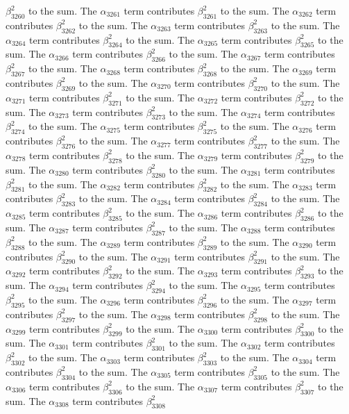 \begin{lemma}
$\beta_{3260}^{2}$ to the sum. The $\alpha_{3261}$ term contributes $\beta_{3261}^{2}$ to the sum. The $\alpha_{3262}$ term contributes $\beta_{3262}^{2}$ to the sum. The $\alpha_{3263}$ term contributes $\beta_{3263}^{2}$ to the sum. The $\alpha_{3264}$ term contributes $\beta_{3264}^{2}$ to the sum. The $\alpha_{3265}$ term contributes $\beta_{3265}^{2}$ to the sum. The $\alpha_{3266}$ term contributes $\beta_{3266}^{2}$ to the sum. The $\alpha_{3267}$ term contributes $\beta_{3267}^{2}$ to the sum. The $\alpha_{3268}$ term contributes $\beta_{3268}^{2}$ to the sum. The $\alpha_{3269}$ term contributes $\beta_{3269}^{2}$ to the sum. The $\alpha_{3270}$ term contributes $\beta_{3270}^{2}$ to the sum. The $\alpha_{3271}$ term contributes $\beta_{3271}^{2}$ to the sum. The $\alpha_{3272}$ term contributes $\beta_{3272}^{2}$ to the sum. The $\alpha_{3273}$ term contributes $\beta_{3273}^{2}$ to the sum. The $\alpha_{3274}$ term contributes $\beta_{3274}^{2}$ to the sum. The $\alpha_{3275}$ term contributes $\beta_{3275}^{2}$ to the sum. The $\alpha_{3276}$ term contributes $\beta_{3276}^{2}$ to the sum. The $\alpha_{3277}$ term contributes $\beta_{3277}^{2}$ to the sum. The $\alpha_{3278}$ term contributes $\beta_{3278}^{2}$ to the sum. The $\alpha_{3279}$ term contributes $\beta_{3279}^{2}$ to the sum. The $\alpha_{3280}$ term contributes $\beta_{3280}^{2}$ to the sum. The $\alpha_{3281}$ term contributes $\beta_{3281}^{2}$ to the sum. The $\alpha_{3282}$ term contributes $\beta_{3282}^{2}$ to the sum. The $\alpha_{3283}$ term contributes $\beta_{3283}^{2}$ to the sum. The $\alpha_{3284}$ term contributes $\beta_{3284}^{2}$ to the sum. The $\alpha_{3285}$ term contributes $\beta_{3285}^{2}$ to the sum. The $\alpha_{3286}$ term contributes $\beta_{3286}^{2}$ to the sum. The $\alpha_{3287}$ term contributes $\beta_{3287}^{2}$ to the sum. The $\alpha_{3288}$ term contributes $\beta_{3288}^{2}$ to the sum. The $\alpha_{3289}$ term contributes $\beta_{3289}^{2}$ to the sum. The $\alpha_{3290}$ term contributes $\beta_{3290}^{2}$ to the sum. The $\alpha_{3291}$ term contributes $\beta_{3291}^{2}$ to the sum. The $\alpha_{3292}$ term contributes $\beta_{3292}^{2}$ to the sum. The $\alpha_{3293}$ term contributes $\beta_{3293}^{2}$ to the sum. The $\alpha_{3294}$ term contributes $\beta_{3294}^{2}$ to the sum. The $\alpha_{3295}$ term contributes $\beta_{3295}^{2}$ to the sum. The $\alpha_{3296}$ term contributes $\beta_{3296}^{2}$ to the sum. The $\alpha_{3297}$ term contributes $\beta_{3297}^{2}$ to the sum. The $\alpha_{3298}$ term contributes $\beta_{3298}^{2}$ to the sum. The $\alpha_{3299}$ term contributes $\beta_{3299}^{2}$ to the sum. The $\alpha_{3300}$ term contributes $\beta_{3300}^{2}$ to the sum. The $\alpha_{3301}$ term contributes $\beta_{3301}^{2}$ to the sum. The $\alpha_{3302}$ term contributes $\beta_{3302}^{2}$ to the sum. The $\alpha_{3303}$ term contributes $\beta_{3303}^{2}$ to the sum. The $\alpha_{3304}$ term contributes $\beta_{3304}^{2}$ to the sum. The $\alpha_{3305}$ term contributes $\beta_{3305}^{2}$ to the sum. The $\alpha_{3306}$ term contributes $\beta_{3306}^{2}$ to the sum. The $\alpha_{3307}$ term contributes $\beta_{3307}^{2}$ to the sum. The $\alpha_{3308}$ term contributes $\beta_{3308}^{2}$ 
\end{lemma}
